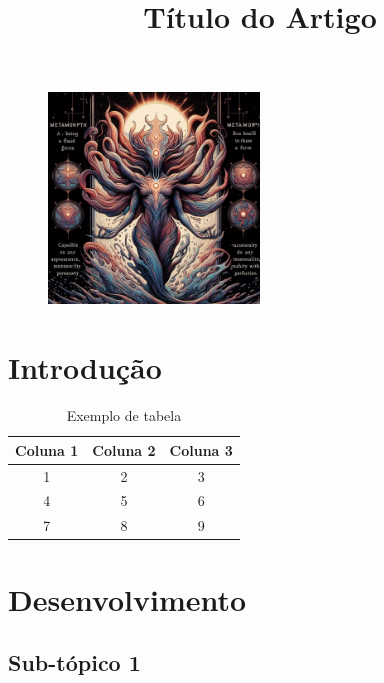 \documentclass{article}
\title{\bfseries\fontsize{16}{16}\selectfont Título do Artigo}
\author{}
\date{}
\begin{document}
\begin{figure}[h]
    \centering
    \includegraphics[width=0.5\textwidth]{Metamorph_All.jpeg}
    \maketitle
\end{figure}
\newpage

\renewcommand{\contentsname}{Sumário}
\tableofcontents
\newpage

\section{Introdução}
\lipsum[1]

\begin{table}[h]
    \centering
    \begin{tabular}{|c|c|c|}
        \hline
        Coluna 1 & Coluna 2 & Coluna 3 \\
        \hline
        1 & 2 & 3 \\
        \hline
        4 & 5 & 6 \\
        \hline
        7 & 8 & 9 \\
        \hline
    \end{tabular}
    \caption{Exemplo de tabela}
\end{table}

\section{Desenvolvimento}
\lipsum[2]

\subsection{Sub-tópico 1}
\lipsum[1]
\end{document}
